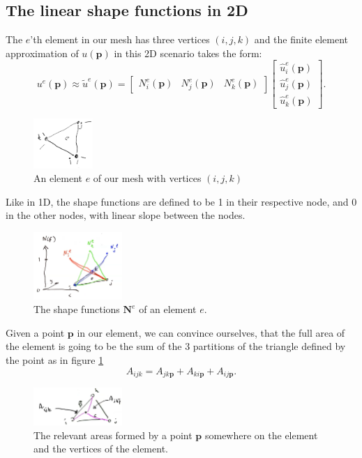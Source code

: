 \documentclass[acmtog]{acmart}
\begin{document}
\subsection{The linear shape functions in 2D}
The $e$'th element in our mesh has three vertices $(i,j,k)$ and the finite element approximation of $u(\boldsymbol p)$ in this 2D scenario takes the form:
%
\begin{equation}
  u^e(\boldsymbol p) \approx \tilde{u}^e(\boldsymbol p) = \begin{bmatrix}
    N_i^e(\boldsymbol p) & N_j^e(\boldsymbol p) & N_k^e(\boldsymbol p)
  \end{bmatrix} \begin{bmatrix}
    \hat{u}_i^e(\boldsymbol p) \\ \hat{u}_j^e(\boldsymbol p) \\ \hat{u}_k^e(\boldsymbol p)
  \end{bmatrix}.
\end{equation}
%
\begin{figure}[H]
  \centering
  \includegraphics[width=0.2\textwidth]{Images/img_3.png}
  \caption{An element $e$ of our mesh with vertices $(i,j,k)$}
\end{figure}
%

Like in 1D, the shape functions are defined to be 1 in their respective node, and $0$ in the other nodes, with linear slope between the nodes.
\begin{figure}[H]
  \centering
  \includegraphics[width=0.3\textwidth]{Images/img_4.png}
  \caption{The shape functions $\boldsymbol N^e$ of an element $e$.}
\end{figure}
%

Given a point $\boldsymbol p$ in our element, we can convince ourselves, that the full area of the element is going to be the sum of the 3 partitions of the triangle defined by the point as in figure \ref{fig:area_partitions}
%
\begin{equation}
  A_{ijk} = A_{jk \boldsymbol p} + A_{ki \boldsymbol p} + A_{ij \boldsymbol p}.
\end{equation}
%
\begin{figure}[H]
  \centering
  \includegraphics[width=0.3\textwidth]{Images/img_5.png}
  \caption{The relevant areas formed by a point $\boldsymbol p$ somewhere on the element and the vertices of the element. \label{fig:area_partitions}}
\end{figure}
%
\end{document}
